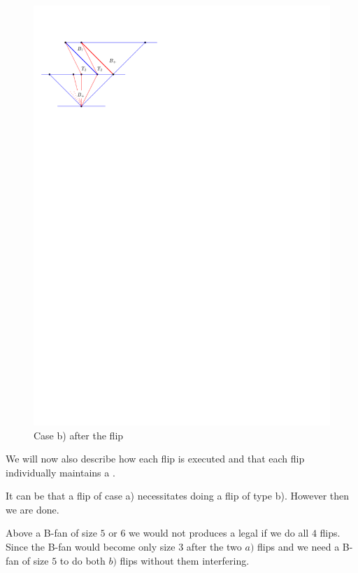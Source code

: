 \begin{figure}[h]
  \centering
  \includegraphics[scale=1]{unifiedAlgo/img/flipactionb}
  \caption{Case b) after the flip}
  \label{fig:uni:flipactionb}
\end{figure}

We will now also describe how each flip is executed and that each flip individually maintains a \rel.






It can be that a flip of case a) necessitates doing a flip of type b). However then we are done.

Above a B-fan of size $5$ or $6$ we would not produces a legal \rel if we do all $4$ flips. Since the B-fan would become only size $3$ after the two $a)$ flips and we need a B-fan of size $5$ to do both $b)$ flips without them interfering.

